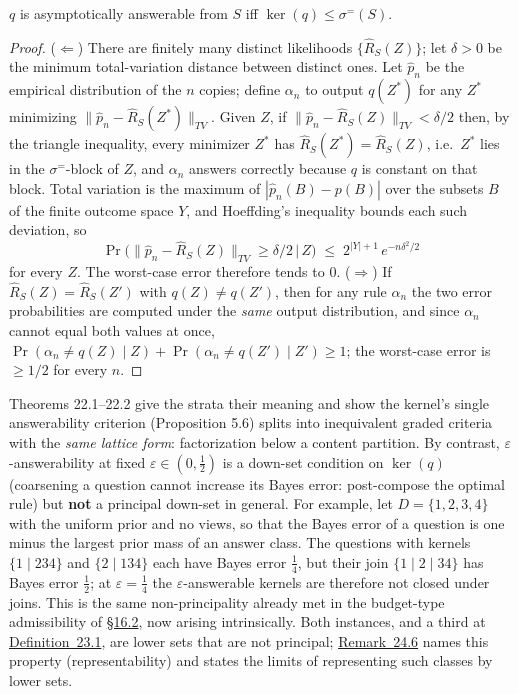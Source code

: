 \begin{thmplain}

\(q\) is asymptotically answerable from \(S\) iff \(\ker(q) \le \sigma^{=}(S)\).
\end{thmplain}

\begin{proof}

(\(\Leftarrow\)) There are finitely many distinct likelihoods \(\{\widehat R_S(Z)\}\); let \(\delta > 0\) be the minimum total-variation distance between distinct ones. Let \(\widehat p_n\) be the empirical distribution of the \(n\) copies; define \(\alpha_n\) to output \(q(Z^*)\) for any \(Z^*\) minimizing \(\|\widehat p_n - \widehat R_S(Z^*)\|_{TV}\). Given \(Z\), if \(\|\widehat p_n - \widehat R_S(Z)\|_{TV} < \delta/2\) then, by the triangle inequality, every minimizer \(Z^*\) has \(\widehat R_S(Z^*) = \widehat R_S(Z)\), i.e.~\(Z^*\) lies in the \(\sigma^=\)-block of \(Z\), and \(\alpha_n\) answers correctly because \(q\) is constant on that block. Total variation is the maximum of \(|\widehat p_n(B) - p(B)|\) over the subsets \(B\) of the finite outcome space \(Y\), and Hoeffding's inequality bounds each such deviation, so
\[
\Pr\big(\|\widehat p_n - \widehat R_S(Z)\|_{TV} \ge \delta/2 \,\big|\, Z\big) \;\le\; 2^{|Y|+1}\, e^{-n\delta^2/2}
\]
for every \(Z\). The worst-case error therefore tends to \(0\). (\(\Rightarrow\)) If \(\widehat R_S(Z) = \widehat R_S(Z')\) with \(q(Z) \ne q(Z')\), then for any rule \(\alpha_n\) the two error probabilities are computed under the \emph{same} output distribution, and since \(\alpha_n\) cannot equal both values at once, \(\Pr(\alpha_n \ne q(Z) \mid Z) + \Pr(\alpha_n \ne q(Z') \mid Z') \ge 1\); the worst-case error is \(\ge 1/2\) for every \(n\).
\end{proof}

Theorems 22.1--22.2 give the strata their meaning and show the kernel's single answerability criterion (Proposition 5.6) splits into inequivalent graded criteria with the \emph{same lattice form}: factorization below a content partition. By contrast, \(\varepsilon\)-answerability at fixed \(\varepsilon \in (0, \tfrac12)\) is a down-set condition on \(\ker(q)\) (coarsening a question cannot increase its Bayes error: post-compose the optimal rule) but \textbf{not} a principal down-set in general. For example, let \(D=\{1,2,3,4\}\) with the uniform prior and no views, so that the Bayes error of a question is one minus the largest prior mass of an answer class. The questions with kernels \(\{1\mid 234\}\) and \(\{2\mid 134\}\) each have Bayes error \(\tfrac14\), but their join \(\{1\mid 2\mid 34\}\) has Bayes error \(\tfrac12\); at \(\varepsilon=\tfrac14\) the \(\varepsilon\)-answerable kernels are therefore not closed under joins. This is the same non-principality already met in the budget-type admissibility of \hyperlink{sec:16.2}{§16.2}, now arising intrinsically. Both instances, and a third at \hyperlink{stmt:23.1}{Definition~23.1}, are lower sets that are not principal; \hyperlink{stmt:24.6}{Remark~24.6} names this property (representability) and states the limits of representing such classes by lower sets.

